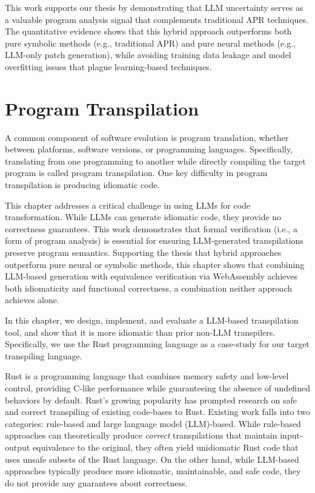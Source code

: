 \documentclass[12pt,openany,oneside,table]{cmuthesis}
\begin{document}
This work supports our thesis by demonstrating that LLM uncertainty serves as a valuable program analysis signal that complements traditional APR techniques. The quantitative evidence shows that this hybrid approach outperforms both pure symbolic methods (e.g., traditional APR) and pure neural methods (e.g., LLM-only patch generation), while avoiding training data leakage and model overfitting issues that plague learning-based techniques.








\chapter{Program Transpilation}
\label{ch:vert}
A common component of software evolution is program translation, whether between platforms, software versions, or programming languages. Specifically, translating from one programming to another while directly compiling the target program is called program transpilation.
One key difficulty in program transpilation is producing idiomatic code.

This chapter addresses a critical challenge in using LLMs for code transformation. While LLMs can generate idiomatic code, they provide no correctness guarantees. This work demonstrates that formal verification (i.e., a form of program analysis) is essential for ensuring LLM-generated transpilations preserve program semantics. Supporting the thesis that hybrid approaches outperform pure neural or symbolic methods, this chapter shows that combining LLM-based generation with equivalence verification via WebAssembly achieves both idiomaticity and functional correctness, a combination neither approach achieves alone.

In this chapter, we design, implement, and evaluate a LLM-based transpilation tool, and show that it is more idiomatic than prior non-LLM transpilers. Specifically, we use the Rust programming language as a case-study for our target transpiling language.

Rust is a programming language that combines memory safety and
low-level control, providing C-like performance while guaranteeing the absence of undefined behaviors by default. Rust's growing popularity has prompted research on safe and correct transpiling of existing code-bases to Rust. Existing work falls into two categories: rule-based and large
language model (LLM)-based. While rule-based approaches can
theoretically produce \textit{correct} transpilations that maintain input-output equivalence to the original, they often yield
unidiomatic Rust code that uses unsafe subsets of
the Rust language. On the other hand, while LLM-based approaches typically produce more idiomatic, maintainable, and safe code, they do not provide any guarantees about correctness.
\end{document}
